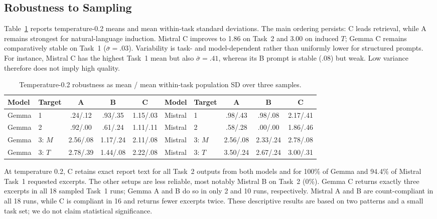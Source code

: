 \documentclass[sigconf,nonacm,anonymous]{acmart}
\begin{document}
\subsection{Robustness to Sampling}
Table~\ref{tab:robustness-results} reports temperature-0.2 means and mean within-task standard deviations. The main ordering persists: C leads retrieval, while A remains strongest for natural-language induction. Mistral C improves to 1.86 on Task~2 and 3.00 on induced $T$; Gemma C remains comparatively stable on Task~1 ($\bar{\sigma}=.03$). Variability is task- and model-dependent rather than uniformly lower for structured prompts. For instance, Mistral C has the highest Task~1 mean but also $\bar{\sigma}=.41$, whereas its B prompt is stable ($.08$) but weak. Low variance therefore does not imply high quality.

\begin{table}[t]
\centering
\small
\setlength{\tabcolsep}{3.2pt}
\caption{Temperature-0.2 robustness as mean / mean within-task population SD over three samples.}
\label{tab:robustness-results}
\begin{tabular}{llccc@{\hspace{8pt}}llccc}
\toprule
\textbf{Model} & \textbf{Target} & \textbf{A} & \textbf{B} & \textbf{C} &
\textbf{Model} & \textbf{Target} & \textbf{A} & \textbf{B} & \textbf{C} \\
\midrule
Gemma & 1 & .24/.12 & .93/.35 & 1.15/.03 &
Mistral & 1 & .98/.43 & .98/.08 & 2.17/.41 \\
Gemma & 2 & .92/.00 & .61/.24 & 1.11/.11 &
Mistral & 2 & .58/.28 & .00/.00 & 1.86/.46 \\
Gemma & 3: $M$ & 2.56/.08 & 1.17/.24 & 2.11/.08 &
Mistral & 3: $M$ & 2.56/.08 & 2.33/.24 & 2.78/.08 \\
Gemma & 3: $T$ & 2.78/.39 & 1.44/.08 & 2.22/.08 &
Mistral & 3: $T$ & 3.50/.24 & 2.67/.24 & 3.00/.31 \\
\bottomrule
\end{tabular}
\end{table}

At temperature 0.2, C retains exact report text for all Task~2 outputs from both models and for 100\% of Gemma and 94.4\% of Mistral Task~1 requested excerpts. The other setups are less reliable, most notably Mistral B on Task~2 (0\%). Gemma C returns exactly three excerpts in all 18 sampled Task~1 runs; Gemma A and B do so in only 2 and 10 runs, respectively. Mistral A and B are count-compliant in all 18 runs, while C is compliant in 16 and returns fewer excerpts twice. These descriptive results are based on two patterns and a small task set; we do not claim statistical significance.
\end{document}
